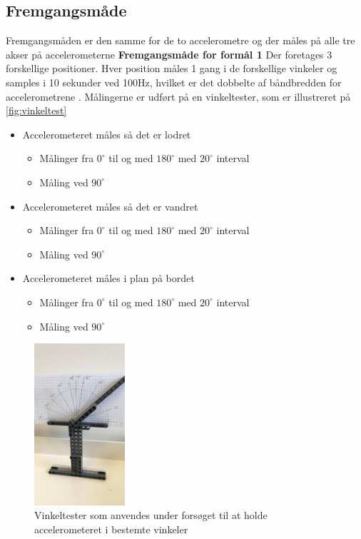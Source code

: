 \subsection{Fremgangsmåde} 
Fremgangsmåden er den samme for de to accelerometre og der måles på alle tre akser på accelerometerne 
\textbf{Fremgangsmåde for formål 1} \label{vinkel_fremgangsmaade}
Der foretages 3 forskellige positioner. Hver position måles 1 gang i de forskellige vinkeler og samples i 10 sekunder ved 100Hz, hvilket er det dobbelte af båndbredden for accelerometrene \citep{analogdevices2010}. Målingerne er udført på en vinkeltester, som er illustreret på \autoref{fig:vinkeltest}
\begin{itemize}
\item Accelerometeret måles så det er lodret
\begin{itemize}
\item Målinger fra $0^{\circ}$ til og med $180^{\circ}$ med $20^{\circ}$ interval 
\item Måling ved $90^{\circ}$  
\end{itemize}
\item Accelerometeret måles så det er vandret
\begin{itemize}
\item Målinger fra $0^{\circ}$ til og med $180^{\circ}$ med $20^{\circ}$ interval 
\item Måling ved $90^{\circ}$  
\end{itemize}
\item Accelerometeret måles i plan på bordet
\begin{itemize}
\item Målinger fra $0^{\circ}$ til og med $180^{\circ}$ med $20^{\circ}$ interval 
\item Måling ved $90^{\circ}$  
\end{itemize}
\end{itemize}


\begin{figure}[H]
\centering
\includegraphics[width=0.3\textwidth]{figures/vinkeltest}
\caption{Vinkeltester som anvendes under forsøget til at holde accelerometeret i bestemte vinkeler}
\label{fig:vinkeltest}
\end{figure}

